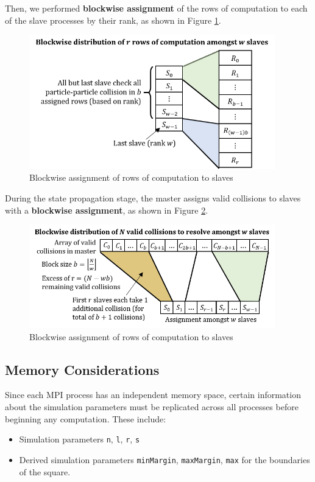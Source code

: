 \documentclass[12pt]{article}
\begin{document}
Then, we performed \textbf{blockwise assignment} of the rows of computation to each of the slave processes by their rank, as shown in Figure \ref{fig:collisionMatrixFoldedAssignment}.

\begin{figure}[H]
    \centering
    \includegraphics[width=0.95\textwidth]{reportAssets/chap3collisionMatrixDecomposition.png}
    \caption{Blockwise assignment of rows of computation to slaves}
    \label{fig:collisionMatrixFoldedAssignment}
\end{figure}

During the state propagation stage, the master assigns valid collisions to slaves with a \textbf{blockwise assignment}, as shown in Figure \ref{fig:collisionArrayAssignment}.

\begin{figure}[H]
    \centering
    \includegraphics[width=0.95\textwidth]{reportAssets/chap3collisionArrayDecomposition.png}
    \caption{Blockwise assignment of rows of computation to slaves}
    \label{fig:collisionArrayAssignment}
\end{figure}

\pagebreak

\subsection{Memory Considerations}
Since each MPI process has an independent memory space, certain information about the simulation parameters must be replicated across all processes before beginning any computation. These include:
\begin{itemize}
    \item Simulation parameters \texttt{n}, \texttt{l}, \texttt{r}, \texttt{s}
    \item Derived simulation parameters \texttt{minMargin}, \texttt{maxMargin}, \texttt{max} for the boundaries of the square.
\end{itemize}
\end{document}
